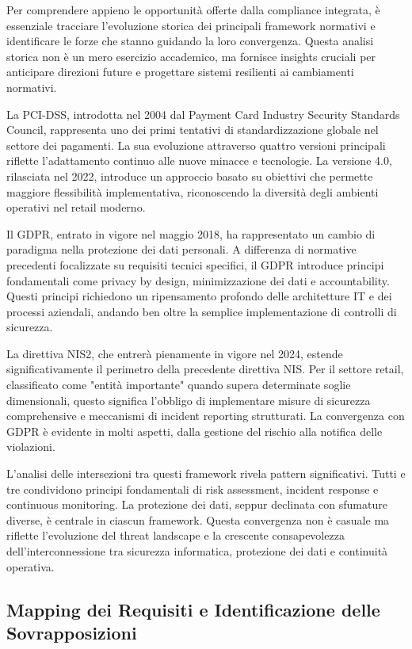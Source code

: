 Per comprendere appieno le opportunità offerte dalla compliance integrata, è essenziale tracciare l'evoluzione storica dei principali framework normativi e identificare le forze che stanno guidando la loro convergenza. Questa analisi storica non è un mero esercizio accademico, ma fornisce insights cruciali per anticipare direzioni future e progettare sistemi resilienti ai cambiamenti normativi.

La PCI-DSS, introdotta nel 2004 dal Payment Card Industry Security Standards Council, rappresenta uno dei primi tentativi di standardizzazione globale nel settore dei pagamenti. La sua evoluzione attraverso quattro versioni principali riflette l'adattamento continuo alle nuove minacce e tecnologie. La versione 4.0, rilasciata nel 2022, introduce un approccio basato su obiettivi che permette maggiore flessibilità implementativa, riconoscendo la diversità degli ambienti operativi nel retail moderno.

Il GDPR, entrato in vigore nel maggio 2018, ha rappresentato un cambio di paradigma nella protezione dei dati personali. A differenza di normative precedenti focalizzate su requisiti tecnici specifici, il GDPR introduce principi fondamentali come privacy by design, minimizzazione dei dati e accountability. Questi principi richiedono un ripensamento profondo delle architetture IT e dei processi aziendali, andando ben oltre la semplice implementazione di controlli di sicurezza.

La direttiva NIS2, che entrerà pienamente in vigore nel 2024, estende significativamente il perimetro della precedente direttiva NIS. Per il settore retail, classificato come "entità importante" quando supera determinate soglie dimensionali, questo significa l'obbligo di implementare misure di sicurezza comprehensive e meccanismi di incident reporting strutturati. La convergenza con GDPR è evidente in molti aspetti, dalla gestione del rischio alla notifica delle violazioni.

L'analisi delle intersezioni tra questi framework rivela pattern significativi. Tutti e tre condividono principi fondamentali di risk assessment, incident response e continuous monitoring. La protezione dei dati, seppur declinata con sfumature diverse, è centrale in ciascun framework. Questa convergenza non è casuale ma riflette l'evoluzione del threat landscape e la crescente consapevolezza dell'interconnessione tra sicurezza informatica, protezione dei dati e continuità operativa.

\subsection{Mapping dei Requisiti e Identificazione delle Sovrapposizioni}

